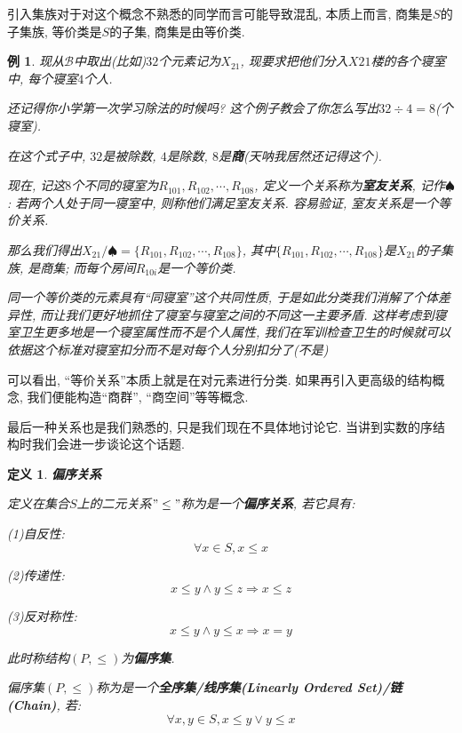 \documentclass[UTF8]{ctexart}
\newcommand{\<}{\langle}
\renewcommand{\>}{\rangle}
\newtheorem{dfn}[thm]{定义}
\newtheorem{xmp}{例}[subsection]
\begin{document}
            引入集族对于对这个概念不熟悉的同学而言可能导致混乱, 本质上而言, 商集是$S$的子集族, 等价类是$S$的子集, 商集是由等价类. 
            
            \begin{xmp}
                现从$\mathcal{B}$中取出(比如)$32$个元素记为$X_{21}$, 现要求把他们分入$X21$楼的各个寝室中, 每个寝室$4$个人. 

                还记得你小学第一次学习除法的时候吗? 这个例子教会了你怎么写出$32\div 4=8$(个寝室). 

                在这个式子中, $32$是被除数, $4$是除数, $8$是\textbf{商}(天呐我居然还记得这个). 

                现在, 记这$8$个不同的寝室为$R_{101},R_{102},\cdots,R_{108}$, 定义一个关系称为\textbf{室友关系}, 记作$\spadesuit$: 若两个人处于同一寝室中, 则称他们满足室友关系. 容易验证, 室友关系是一个等价关系. 

                那么我们得出$X_{21}/\spadesuit=\{R_{101},R_{102},\cdots,R_{108}\}$, 其中$\{R_{101},R_{102},\cdots,R_{108}\}$是$X_{21}$的子集族, 是商集; 而每个房间$R_{10i}$是一个等价类. 

                同一个等价类的元素具有``同寝室''这个共同性质, 于是如此分类我们消解了个体差异性, 而让我们更好地抓住了寝室与寝室之间的不同这一主要矛盾. 这样考虑到寝室卫生更多地是一个寝室属性而不是个人属性, 我们在军训检查卫生的时候就可以依据这个标准对寝室扣分而不是对每个人分别扣分了(不是)
            \end{xmp}
            
            可以看出, ``等价关系''本质上就是在对元素进行分类. 如果再引入更高级的结构概念, 我们便能构造``商群'', ``商空间''等等概念. 

            最后一种关系也是我们熟悉的, 只是我们现在不具体地讨论它. 当讲到实数的序结构时我们会进一步谈论这个话题. 

            \begin{dfn}
                \textbf{偏序关系}
        
                定义在集合$S$上的二元关系$"\leq"$称为是一个\textbf{偏序关系}, 若它具有: 
        
                (1)自反性: 
                \[\forall x\in S, x\leq x\]
                
                (2)传递性: 
                \[x\leq y\wedge y\leq z\Longrightarrow x\leq z\]
        
                (3)反对称性: 
                \[x\leq y\wedge y\leq x\Longrightarrow x=y\]
        
                此时称结构$(P,\leq)$为\textbf{偏序集}. 
        
                偏序集$(P,\leq)$称为是一个\textbf{全序集/线序集(Linearly Ordered Set)/链(Chain)}, 若: 
                \[\forall x,y\in S, x\leq y\vee y\leq x\]
            \end{dfn}
\end{document}
